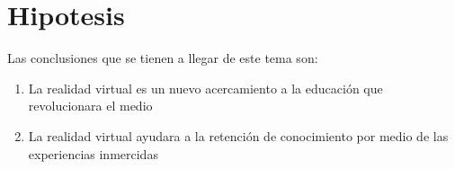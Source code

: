 \section{Hipotesis}
Las conclusiones que se tienen a llegar de este tema son: 
\begin{enumerate}
   \item La realidad virtual es un nuevo acercamiento a la educación que revolucionara el medio
   \item La realidad virtual ayudara a la retención de conocimiento por medio de las experiencias inmercidas
   \end{enumerate}
